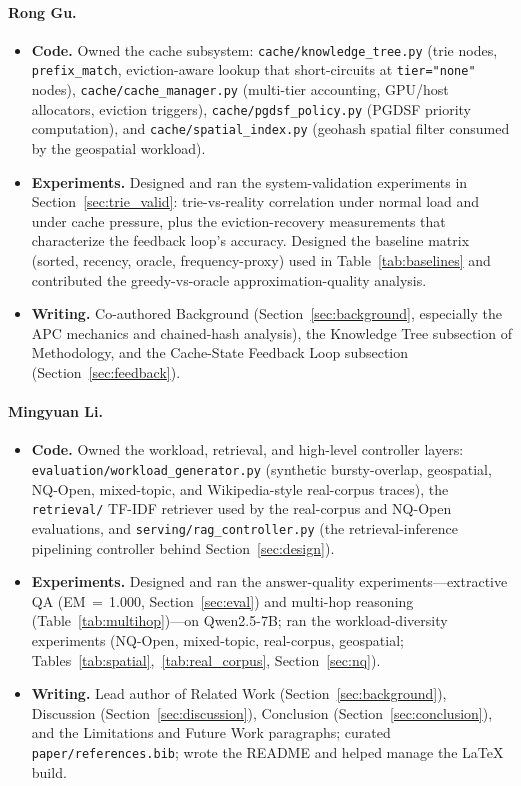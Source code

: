 \documentclass{article}
\begin{document}
\paragraph{Rong Gu.}
\begin{itemize}
\item \textbf{Code.} Owned the cache subsystem: \texttt{cache/knowledge\_tree.py} (trie nodes, \texttt{prefix\_match}, eviction-aware lookup that short-circuits at \texttt{tier="none"} nodes), \texttt{cache/cache\_manager.py} (multi-tier accounting, GPU/host allocators, eviction triggers), \texttt{cache/pgdsf\_policy.py} (PGDSF priority computation), and \texttt{cache/spatial\_index.py} (geohash spatial filter consumed by the geospatial workload).
\item \textbf{Experiments.} Designed and ran the system-validation experiments in Section~\ref{sec:trie_valid}: trie-vs-reality correlation under normal load and under cache pressure, plus the eviction-recovery measurements that characterize the feedback loop's accuracy. Designed the baseline matrix (sorted, recency, oracle, frequency-proxy) used in Table~\ref{tab:baselines} and contributed the greedy-vs-oracle approximation-quality analysis.
\item \textbf{Writing.} Co-authored Background (Section~\ref{sec:background}, especially the APC mechanics and chained-hash analysis), the Knowledge Tree subsection of Methodology, and the Cache-State Feedback Loop subsection (Section~\ref{sec:feedback}).
\end{itemize}

\paragraph{Mingyuan Li.}
\begin{itemize}
\item \textbf{Code.} Owned the workload, retrieval, and high-level controller layers: \texttt{evaluation/workload\_generator.py} (synthetic bursty-overlap, geospatial, NQ-Open, mixed-topic, and Wikipedia-style real-corpus traces), the \texttt{retrieval/} TF-IDF retriever used by the real-corpus and NQ-Open evaluations, and \texttt{serving/rag\_controller.py} (the retrieval-inference pipelining controller behind Section~\ref{sec:design}).
\item \textbf{Experiments.} Designed and ran the answer-quality experiments---extractive QA (EM\,$=$\,1.000, Section~\ref{sec:eval}) and multi-hop reasoning (Table~\ref{tab:multihop})---on Qwen2.5-7B; ran the workload-diversity experiments (NQ-Open, mixed-topic, real-corpus, geospatial; Tables~\ref{tab:spatial},~\ref{tab:real_corpus}, Section~\ref{sec:nq}).
\item \textbf{Writing.} Lead author of Related Work (Section~\ref{sec:background}), Discussion (Section~\ref{sec:discussion}), Conclusion (Section~\ref{sec:conclusion}), and the Limitations and Future Work paragraphs; curated \texttt{paper/references.bib}; wrote the README and helped manage the LaTeX build.
\end{itemize}
\end{document}
